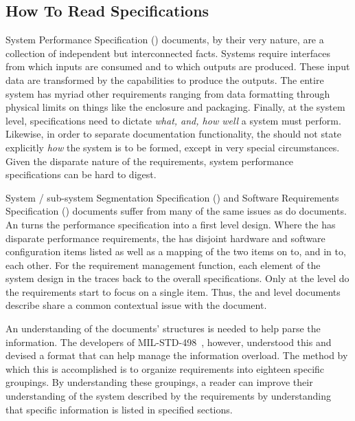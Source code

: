 \subsection{How To Read Specifications}
\label{ssec:Intro_HowToRead}

System Performance Specification (\SPS) documents, by their very nature, are a collection of independent but interconnected facts.
Systems require interfaces from which inputs are consumed and to which outputs are produced.
These input data are transformed by the capabilities to produce the outputs.
The entire system has myriad other requirements ranging from data formatting through physical limits on things like the enclosure and packaging.
Finally, at the system level, specifications need to dictate {\em what, and, how well} a system must perform.
Likewise, in order to separate documentation functionality, the \SPS should not state explicitly {\em how} the system is to be formed, except in very special circumstances.
Given the disparate nature of the requirements, system performance specifications can be hard to digest.


System / sub-system Segmentation Specification (\SSS) and Software Requirements Specification (\SRS) documents suffer from many of the same issues as do \SPS documents.
An \SSS turns the performance specification into a first level design.
Where the \SPS has disparate performance requirements, the \SSS has disjoint hardware and software configuration items listed as well as a mapping of the two items on to, and in to, each other.
For the requirement management function, each element of the system design in the \SSS traces back to the overall \SPS specifications.
Only at the \SRS level do the requirements start to focus on a single item.
Thus, the \SSS and \SRS level documents describe share a common contextual issue with the \SPS document.


An understanding of the documents' structures is needed to help parse the information.
The developers of MIL-STD-498~\cite{ref__MIL_STD_498}, however, understood this and devised a format that can help manage the information overload.
The method by which this is accomplished is to organize requirements into eighteen specific groupings.
By understanding these groupings, a reader can improve their understanding of the system described by the requirements by understanding that specific information is listed in specified sections.


